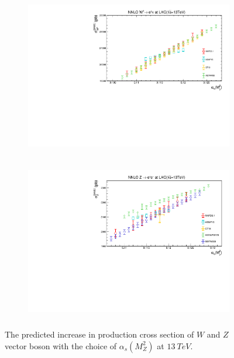 \begin{figure}[H]\label{WZ13_inc}
\centering
\begin{subfigure}{0.8\textwidth}
\includegraphics[height=7cm ,width=\textwidth]{chapter4/PDF_W.pdf}
\vspace*{-8mm}
\caption{}
\label{var_cs}
\end{subfigure}
\begin{subfigure}{0.8\textwidth}
\includegraphics[height=7cm, width=\textwidth]{chapter4/PDF_Z.pdf}
\vspace*{-8mm}
\caption{}
\label{var_cs1}
\end{subfigure}
\caption{The predicted increase in production cross section of $W$ and $Z$ vector boson with the choice of $\alpha_{s}(M_{Z}^{2})$ at $13~TeV$.}
 \end{figure}

